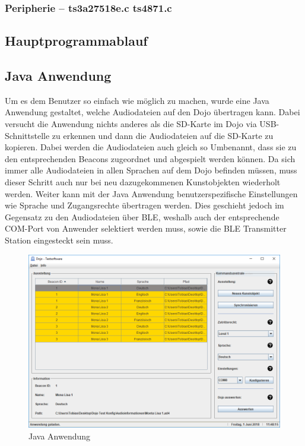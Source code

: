 \subsubsection{Peripherie -- ts3a27518e.c ts4871.c}

\subsection{Hauptprogrammablauf}


\subsection{Java Anwendung}

Um es dem Benutzer so einfach wie möglich zu machen, wurde eine Java Anwendung gestaltet, welche Audiodateien auf den Dojo übertragen kann. Dabei versucht die Anwendung nichts anderes als die SD-Karte im Dojo via USB-Schnittstelle zu erkennen und dann die Audiodateien auf die SD-Karte zu kopieren. Dabei werden die Audiodateien auch gleich so Umbenannt, dass sie zu den entsprechenden Beacons zugeordnet und abgespielt werden können. Da sich immer alle Audiodateien in allen Sprachen auf dem Dojo befinden müssen, muss dieser Schritt auch nur bei neu dazugekommenen Kunstobjekten wiederholt werden. Weiter kann mit der Java Anwendung benutzerspezifische Einstellungen wie Sprache und Zugangsrechte übertragen werden. Dies geschieht jedoch im Gegensatz zu den Audiodateien über BLE, weshalb auch der entsprechende COM-Port von Anwender selektiert werden muss, sowie die BLE Transmitter Station eingesteckt sein muss.

\newpage

\begin{figure}[htb]
	\centering
	\includegraphics[width=\textwidth]{graphics/Java_Anwendung.png}
	\caption{Java Anwendung}
	\label{fig:Java Anwendung}
\end{figure}

